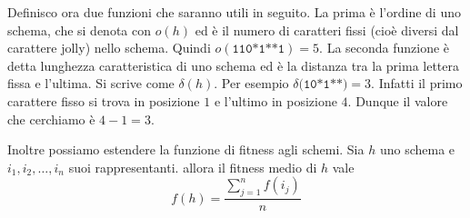 \documentclass[a4paper, 11pt]{article}
\newcommand{\code}{\texttt}
\begin{document}
Definisco ora due funzioni che saranno utili in seguito. La prima \`e l'ordine
di uno schema, che si denota con $o(h)$ ed \`e il numero di caratteri fissi
(cio\`e diversi dal carattere jolly) nello schema. Quindi
$o(\code{110*1**1})=5$. La seconda funzione \`e detta lunghezza caratteristica
di uno schema ed \`e la distanza tra la prima lettera fissa e l'ultima. Si
scrive come $\delta(h)$. Per esempio $\delta( \code{10*1**)} = 3$. Infatti il
primo carattere fisso si trova in posizione $1$ e l'ultimo in posizione $4$.
Dunque il valore che cerchiamo \`e $4-1=3$.

Inoltre possiamo estendere la funzione di fitness agli schemi. Sia $h$ uno
schema e $i_1, i_2, \ldots ,i_n$ suoi rappresentanti. allora il fitness medio di
$h$ vale
$$f(h)=\frac{\sum\limits_{j=1}^n f(i_j)}{n}$$
\end{document}
